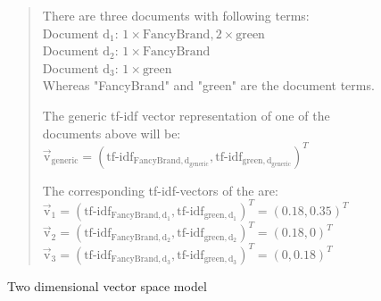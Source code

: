 \begin{figure}[h]

    \begin{quote}
        There are three documents with following terms:\\
        Document $\text{d}_1$: $1\times \text{FancyBrand}, 2\times \text{green}$\\
        Document $\text{d}_2$: $1\times \text{FancyBrand}$\\
        Document $\text{d}_3$: $1\times \text{green}$\\
        Whereas "FancyBrand" and "green" are the document terms.

        \noindent
        The generic tf-idf vector representation of one of the documents above will be:\\
        $\vec{\text{v}}_{\text{generic}} = (\text{tf-idf}_{\text{FancyBrand},\text{d}_\text{generic}}, \text{tf-idf}_{\text{green},\text{d}_\text{generic}})^T$

        \noindent
        The corresponding tf-idf-vectors of the are:\\
        $\vec{\text{v}}_1 = (\text{tf-idf}_{\text{FancyBrand},\text{d}_1}, \text{tf-idf}_{\text{green},\text{d}_1})^T = (0.18, 0.35)^T$\\
        $\vec{\text{v}}_2 = (\text{tf-idf}_{\text{FancyBrand},\text{d}_2}, \text{tf-idf}_{\text{green},\text{d}_2})^T = (0.18, 0)^T$\\
        $\vec{\text{v}}_3 = (\text{tf-idf}_{\text{FancyBrand},\text{d}_3}, \text{tf-idf}_{\text{green},\text{d}_3})^T = (0, 0.18)^T$\\
    \end{quote}

    \center

    \caption{Two dimensional vector space model}
    \label{fig:vectorspacemodel}
\end{figure}


